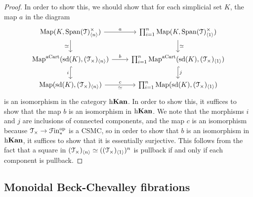 \documentclass[main.tex]{subfiles}
\begin{document}
\begin{proof}
  In order to show this, we should show that for each simplicial set $K$, the map $a$ in the diagram
  \begin{equation*}
    \begin{tikzcd}
      \Map(K, \Span(\category{T})^{\times}_{\langle n \rangle})
      \arrow[r, "a"]
      \arrow[d, swap, "\simeq"]
      & \prod_{i = 1}^{n} \Map(K, \Span(\category{T})^{\times}_{\langle 1 \rangle})
      \arrow[d, "\simeq"]
      \\
      \Map^{\aCart}(\sd(K), (\category{T}_{\times})_{\langle n \rangle}) \arrow[r, "b"]
      \arrow[d, hook, "i"{swap}]
      & \prod_{i = 1}^{n} \Map^{\aCart}(\sd(K), (\category{T}_{\times})_{\langle 1 \rangle})
      \arrow[d, hook, "j"]
      \\
      \Map(\sd(K), (\category{T}_{\times})_{\langle n \rangle}) \arrow[r, "c", "\simeq"{swap}]
      & \prod_{i = 1}^{n} \Map(\sd(K), (\category{T}_{\times})_{\langle 1 \rangle})
    \end{tikzcd}
  \end{equation*}
  is an isomorphism in the category $\mathrm{h} \mathbf{Kan}$. In order to show this, it suffices to show that the map $b$ is an isomorphism in $\mathrm{h} \mathbf{Kan}$. We note that the morphisms $i$ and $j$ are inclusions of connected components, and the map $c$ is an isomorphism because $\mathcal{T}_{\times} \to \mathcal{F}\mathrm{in}_{*}^{\mathrm{op}}$ is a CSMC, so in order to show that $b$ is an isomorphism in $\mathrm{h}\mathbf{Kan}$, it suffices to show that it is essentially surjective. This follows from the fact that a square in $(\mathcal{T}_{\times})_{\langle n \rangle} \simeq ((\mathcal{T}_{\times})_{\langle 1 \rangle})^{n}$ is pullback if and only if each component is pullback.
\end{proof}


\subsection{Monoidal Beck-Chevalley fibrations}
\label{ssc:monoidal_beck_chevalley_fibrations}
\end{document}
